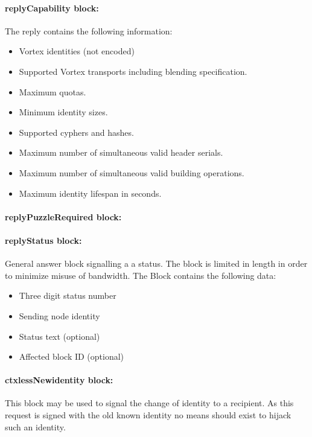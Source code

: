 \paragraph{replyCapability block:}
The reply contains the following information:
\begin{itemize}
	\item Vortex identities (not encoded)
	\item Supported Vortex transports including blending specification.
	\item Maximum quotas.
	\item Minimum identity sizes.
	\item Supported cyphers and hashes.
	\item Maximum number of simultaneous valid header serials.
	\item Maximum number of simultaneous valid building operations.
	\item Maximum identity lifespan in seconds.
\end{itemize}

\paragraph{replyPuzzleRequired block:}


\paragraph{replyStatus block:}
General answer block signalling a a status. The block is limited in length in order to minimize misuse of bandwidth. The Block contains the following data:
\begin{itemize}
	\item Three digit status number
	\item Sending node identity
	\item Status text (optional)
	\item Affected block ID (optional)
\end{itemize}

\paragraph{ctxlessNewidentity block:}
This block may be used to signal the change of identity to a recipient. As this request is signed with the old known identity no means should exist to hijack such an identity.

